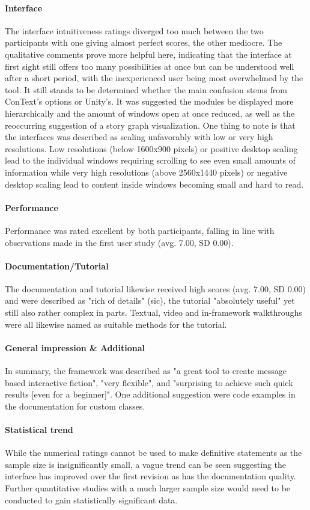 \paragraph{Interface} The interface intuitiveness ratings diverged too much between the two participants with one giving almost perfect scores, the other mediocre. 
The qualitative comments prove more helpful here, indicating that the interface at first sight still offers too many possibilities at once but can be understood well after a short period, with the inexperienced user being most overwhelmed by the tool. It still stands to be determined whether the main confusion stems from ConText's options or Unity's. 
It was suggested the modules be displayed more hierarchically and the amount of windows open at once reduced, as well as the reoccurring suggestion of a story graph visualization. 
One thing to note is that the interfaces was described as scaling unfavorably with low or very high resolutions. Low resolutions (below 1600x900 pixels) or positive desktop scaling lead to the individual windows requiring scrolling to see even small amounts of information while very high resolutions (above 2560x1440 pixels) or negative desktop scaling lead to content inside windows becoming small and hard to read. 
\paragraph{Performance} Performance was rated excellent by both participants, falling in line with observations made in the first user study (avg. 7.00, SD 0.00). 
\paragraph{Documentation/Tutorial} The documentation and tutorial likewise received high scores (avg. 7.00, SD 0.00) and were described as "rich of details" (sic), the tutorial "absolutely useful" yet still also rather complex in parts. Textual, video and in-framework walkthroughs were all likewise named as suitable methods for the tutorial. 
\paragraph{General impression \& Additional} In summary, the framework was described as "a great tool to create message based interactive fiction", "very flexible", and "surprising to achieve such quick results [even for a beginner]". 
One additional suggestion were code examples in the documentation for custom classes.
\paragraph{Statistical trend} While the numerical ratings cannot be used to make definitive statements as the sample size is insignificantly small, a vague trend can be seen suggesting the interface has improved over the first revision as has the documentation quality. Further quantitative studies with a much larger sample size would need to be conducted to gain statistically significant data. 

